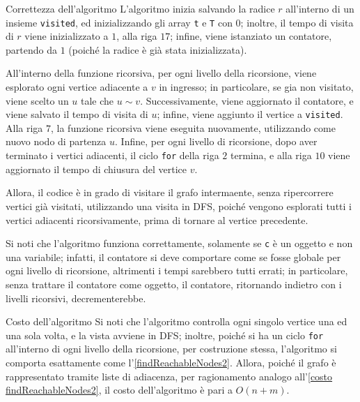 \documentclass[a4paper, 12pt]{report}
\begin{document}
    \begin{framedobs}{Correttezza dell'algoritmo}
        L'algoritmo inizia salvando la radice $r$ all'interno di un insieme \texttt{visited}, ed inizializzando gli array \texttt{t} e \texttt{T} con $0$; inoltre, il tempo di visita di $r$ viene inizializzato a $1$, alla riga $17$; infine, viene istanziato un contatore, partendo da $1$ (poiché la radice è già stata inizializzata).

        All'interno della funzione ricorsiva, per ogni livello della ricorsione, viene esplorato ogni vertice adiacente a $v$ in ingresso; in particolare, se gia non visitato, viene scelto un $u$ tale che $u \sim v$. Successivamente, viene aggiornato il contatore, e viene salvato il tempo di visita di $u$; infine, viene aggiunto il vertice a \texttt{visited}. Alla riga $7$, la funzione ricorsiva viene eseguita nuovamente, utilizzando come nuovo nodo di partenza $u$. Infine, per ogni livello di ricorsione, dopo aver terminato i vertici adiacenti, il ciclo \texttt{for} della riga $2$ termina, e alla riga $10$ viene aggiornato il tempo di chiusura del vertice $v$.

        Allora, il codice è in grado di visitare il grafo intermaente, senza ripercorrere vertici già visitati, utilizzando una visita in DFS, poiché vengono esplorati tutti i vertici adiacenti ricorsivamente, prima di tornare al vertice precedente.

        Si noti che l'algoritmo funziona correttamente, solamente se \texttt{c} è un oggetto e non una variabile; infatti, il contatore si deve comportare come se fosse globale per ogni livello di ricorsione, altrimenti i tempi sarebbero tutti errati; in particolare, senza trattare il contatore come oggetto, il contatore, ritornando indietro con i livelli ricorsivi, decrementerebbe.
    \end{framedobs}

    \begin{framedobs}{Costo dell'algoritmo}
        Si noti che l'algoritmo controlla ogni singolo vertice una ed una sola volta, e la vista avviene in DFS; inoltre, poiché si ha un ciclo \texttt{for} all'interno di ogni livello della ricorsione, per costruzione stessa, l'algoritmo si comporta esattamente come l'\cref{findReachableNodes2}. Allora, poiché il grafo è rappresentato tramite liste di adiacenza, per ragionamento analogo all'\cref{costo findReachableNodes2}, il costo dell'algoritmo è pari a $O(n + m)$.
    \end{framedobs}
\end{document}
